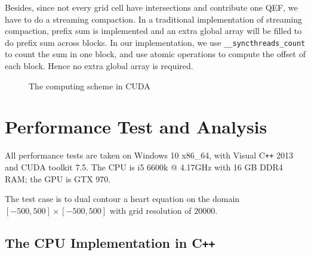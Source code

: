 \documentclass[a4paper,12pt]{article}
\begin{document}
Besides, since not every grid cell have intersections and contribute
one QEF, we have to do a streaming compaction.
In a traditional implementation of streaming compaction,
prefix sum is implemented and an extra global array will be filled to
do prefix sum across blocks.
In our implementation, we use \texttt{\_\_syncthreads\_count}
to count the sum in one block,
and use atomic operations to compute the offset of each block.
Hence no extra global array is required.

\begin{figure}[h]
\centering
{}
\caption{The computing scheme in CUDA}
\label{fig:computing-scheme-cuda}
\end{figure}

\section{Performance Test and Analysis}

All performance tests are taken on Windows 10 x86\_64,
with Visual C\texttt{++} 2013 and CUDA toolkit 7.5.
The CPU is i5 6600k @ 4.17GHz with 16 GB DDR4 RAM; the GPU is GTX 970.

The test case is to dual contour a heart equation
on the domain $[-500, 500]\times[-500, 500]$
with grid resolution of $20000$.

\subsection{The CPU Implementation in C\texttt{++}}
\end{document}
